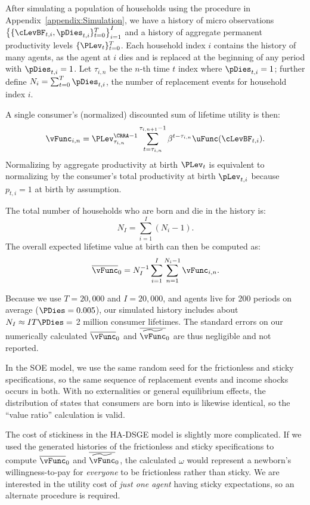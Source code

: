 
After simulating a population of households using the procedure in Appendix~\ref{appendix:Simulation},
we have a history of micro observations $\left\{ \{\cLevBF_{t,i}, \pDies_{t,i}\}_{t=0}^T \right\}_{i=1}^I$
and a history of aggregate permanent productivity levels $\{ \PLev_t \}_{t=0}^T$.  Each household index
$i$ contains the history of many agents, as the agent at $i$ dies and is replaced at the beginning of any period
with $\pDies_{t,i}=1$.  Let $\tau_{i,n}$ be the $n$-th time $t$ index where $\pDies_{t,i}=1$; further define
$N_i = \sum_{t=0}^T \pDies_{t,i}$, the number of replacement events for household index $i$.

A single consumer's (normalized) discounted sum of lifetime utility is then:
\begin{equation}
\vFunc_{i,n} =  \PLev_{\tau_{i,n}}^{\CRRA-1} \sum_{t=\tau_{i,n}}^{\tau_{i,n+1}-1} \beta^{t-\tau_{i,n}} \uFunc(\cLevBF_{t,i}).
\end{equation}
Normalizing by aggregate productivity at birth $\PLev_t$ is equivalent to normalizing by the consumer's
total productivity at birth $\pLev_{t,i}$ because $p_{t,i}=1$ at birth by assumption.

The total number of households who are born and die in the history is:
\begin{equation}
N_I = \sum_{i=1}^I (N_i - 1).
\end{equation}
The overall expected lifetime value at birth can then be computed as:
\begin{equation}
\overline{\vFunc}_0 = N_I^{-1} \sum_{i=1}^I \sum_{n=1}^{N_i-1} \vFunc_{i,n}.
\end{equation}

Because we use $T=20,000$ and $I=20,000$, and agents live for 200 periods on average ($\PDies = 0.005$),
our simulated history includes about $N_I \approx I T \PDies =$ 2 million consumer lifetimes.  The standard errors
on our numerically calculated $\overline{\vFunc}_0$ and $\overline{\widetilde{\vFunc}}_0$ are thus negligible
and not reported.

In the SOE model, we use the same random seed for the frictionless and sticky specifications, so
the same sequence of replacement events and income shocks occurs in both. With no externalities
or general equilibrium effects, the distribution of states that consumers are born into is likewise identical,
so the ``value ratio'' calculation is valid.

The cost of stickiness in the HA-DSGE model is slightly more complicated.  If we
used the generated histories of the frictionless and sticky specifications to compute
$\overline{\vFunc}_0$ and $\overline{\widetilde{\vFunc}}_0$, the calculated $\omega$
would represent a newborn's willingness-to-pay for \textit{everyone} to be frictionless
rather than sticky. We are interested in the utility cost of \textit{just one agent} having
sticky expectations, so an alternate procedure is required.

